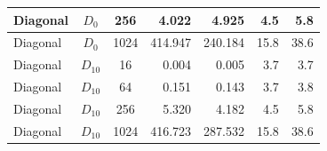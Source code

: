 \begin{table}[htbp]
\begin{tabular}{|l|c|c|r|r|r|r|}
Diagonal & $D_{0}$ & 256 & 4.022 & 4.925 & 4.5 & 5.8 \\ \hline
Diagonal & $D_{0}$ & 1024 & 414.947 & 240.184 & 15.8 & 38.6 \\ \hline
Diagonal & $D_{10}$ & 16 & 0.004 & 0.005 & 3.7 & 3.7 \\ \hline
Diagonal & $D_{10}$ & 64 & 0.151 & 0.143 & 3.7 & 3.8 \\ \hline
Diagonal & $D_{10}$ & 256 & 5.320 & 4.182 & 4.5 & 5.8 \\ \hline
Diagonal & $D_{10}$ & 1024 & 416.723 & 287.532 & 15.8 & 38.6 \\ \hline
\end{tabular}
\label{tab:matrix_mediciones}
\end{table}
